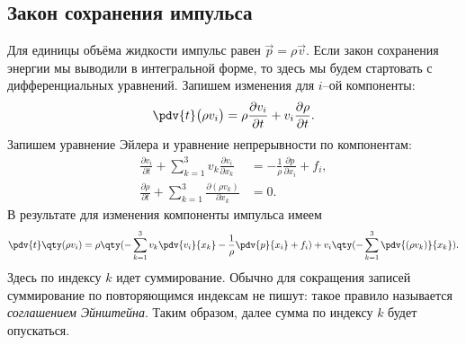 \subsection{Закон сохранения импульса}
Для единицы объёма жидкости импульс равен $ \vec { p } = \rho \vec{v} $. Если закон сохранения энергии мы выводили в интегральной форме, то здесь мы будем стартовать с дифференциальных уравнений. Запишем изменения для $i$--ой компоненты:
\begin{equation}
\pdv{t} \big( \rho v _ { i } \big) = \rho \frac { \partial v _ { i } } { \partial t } + v _ { i } \frac { \partial \rho } { \partial t }.
\end{equation}
Запишем уравнение Эйлера и уравнение непрерывности по компонентам:
\begin{equation}\begin{aligned}
\frac { \partial v _ { i } } { \partial t } + \sum _ { k = 1 } ^ { 3 } v _ { k } \frac { \partial v _ { i } } { \partial x_k } &= - \frac { 1 } { \rho } \frac { \partial p } { \partial x _ { i } } + f _ { i }, \\
\frac { \partial \rho } { \partial t } + \sum _ { k = 1 } ^ { 3 } \frac { \partial \left( \rho v _ { k } \right) } { \partial x _ { k } } &= 0.
\end{aligned}\end{equation}
В результате для изменения компоненты импульса имеем
\begin{equation}
	\pdv{t}\qty(\rho v_i)=
	\rho\qty(-\sum\limits_{k=1}^3 v_k\pdv{v_i}{x_k}-\frac{1}{\rho} \pdv{p}{x_i} + f_i)+
	v_i\qty(-\sum\limits_{k=1}^3 \pdv{(\rho v_k)}{x_k}).
\end{equation}
Здесь по индексу $k$ идет суммирование. Обычно для сокращения записей суммирование по повторяющимся индексам не пишут: такое правило называется \textit{соглашением Эйнштейна}. Таким образом, далее сумма по индексу $k$ будет опускаться.

